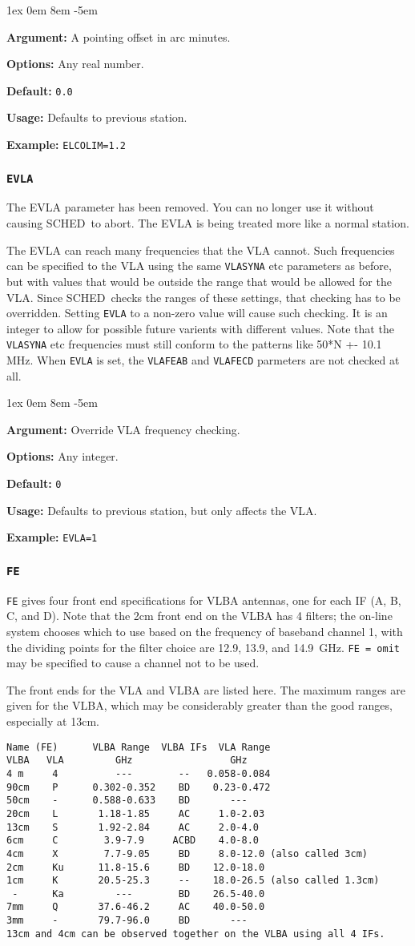 \documentclass{report}
\newcommand{\schedb}{{\sc SCHED~}}
\newcommand{\rcwbox}[5]{
  \begin{list}{}{\parsep 1ex  \itemsep 0em
                 \leftmargin 8em  \itemindent -5em }
    \item {\bf Argument:} #1
    \item {\bf Options:}  #2
    \item {\bf Default:}  #3
    \item {\bf Usage:}    #4
    \item {\bf Example:}  #5
  \end{list}
}
\begin{document}
\rcwbox
{A pointing offset in arc minutes.}
{Any real number.}
{{\tt 0.0}}
{Defaults to previous station.}
{{\tt ELCOLIM=1.2}}

\subsubsection{\label{SP:EVLA}{\tt EVLA}}

The EVLA parameter has been removed.  You can no longer use it without
causing \schedb to abort.  The EVLA is being treated more like a
normal station.

The EVLA can reach many frequencies that the VLA cannot.  Such
frequencies can be specified to the VLA using the same {\tt VLASYNA}
etc parameters as before, but with values that would be outside the
range that would be allowed for the VLA.  Since \schedb checks the
ranges of these settings, that checking has to be overridden.  Setting
{\tt EVLA} to a non-zero value will cause such checking.  It is an
integer to allow for possible future varients with different values.
Note that the {\tt VLASYNA} etc frequencies must still conform to the
patterns like 50*N +- 10.1 MHz.  When {\tt EVLA} is set, the {\tt VLAFEAB}
and {\tt VLAFECD} parmeters are not checked at all.

\rcwbox
{Override VLA frequency checking.}
{Any integer.}
{{\tt 0}}
{Defaults to previous station, but only affects the VLA.}
{{\tt EVLA=1}}


\subsubsection{\label{SP:FE}{\tt FE}}

{\tt FE} gives four front end specifications for VLBA antennas, one
for each IF (A, B, C, and D). Note that the 2cm front end on the VLBA
has 4 filters; the on-line system chooses which to use based on the
frequency of baseband channel 1, with the dividing points for the
filter choice are 12.9, 13.9, and 14.9~GHz.  {\tt FE = omit} may
be specified to cause a channel not to be used.

The front ends for the VLA and VLBA are listed here.  The maximum
ranges are given for the VLBA, which may be considerably greater than
the good ranges, especially at 13cm.

\begin{verbatim}
Name (FE)      VLBA Range  VLBA IFs  VLA Range   
VLBA   VLA         GHz                 GHz
4 m     4          ---        --   0.058-0.084  
90cm    P      0.302-0.352    BD    0.23-0.472   
50cm    -      0.588-0.633    BD       ---
20cm    L       1.18-1.85     AC     1.0-2.03     
13cm    S       1.92-2.84     AC     2.0-4.0    
6cm     C        3.9-7.9     ACBD    4.0-8.0      
4cm     X        7.7-9.05     BD     8.0-12.0 (also called 3cm)
2cm     Ku      11.8-15.6     BD    12.0-18.0    
1cm     K       20.5-25.3     --    18.0-26.5 (also called 1.3cm)
 -      Ka         ---        BD    26.5-40.0    
7mm     Q       37.6-46.2     AC    40.0-50.0    
3mm     -       79.7-96.0     BD       ---
13cm and 4cm can be observed together on the VLBA using all 4 IFs.
\end{verbatim}
\end{document}
